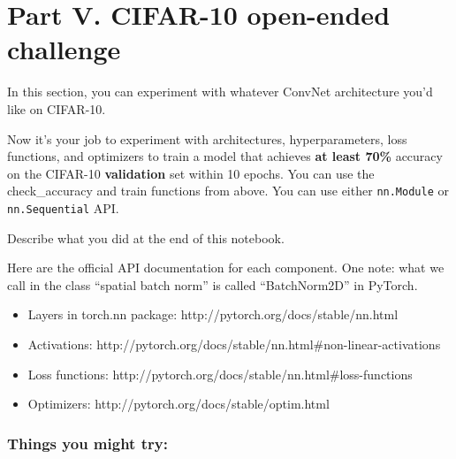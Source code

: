 \documentclass[11pt]{article}
\providecommand{\tightlist}{%
      \setlength{\itemsep}{0pt}\setlength{\parskip}{0pt}}
\begin{document}
    \hypertarget{part-v.-cifar-10-open-ended-challenge}{%
\section{Part V. CIFAR-10 open-ended
challenge}\label{part-v.-cifar-10-open-ended-challenge}}

In this section, you can experiment with whatever ConvNet architecture
you'd like on CIFAR-10.

Now it's your job to experiment with architectures, hyperparameters,
loss functions, and optimizers to train a model that achieves \textbf{at
least 70\%} accuracy on the CIFAR-10 \textbf{validation} set within 10
epochs. You can use the check\_accuracy and train functions from above.
You can use either \texttt{nn.Module} or \texttt{nn.Sequential} API.

Describe what you did at the end of this notebook.

Here are the official API documentation for each component. One note:
what we call in the class ``spatial batch norm'' is called
``BatchNorm2D'' in PyTorch.

\begin{itemize}
\tightlist
\item
  Layers in torch.nn package: http://pytorch.org/docs/stable/nn.html
\item
  Activations:
  http://pytorch.org/docs/stable/nn.html\#non-linear-activations
\item
  Loss functions: http://pytorch.org/docs/stable/nn.html\#loss-functions
\item
  Optimizers: http://pytorch.org/docs/stable/optim.html
\end{itemize}

\hypertarget{things-you-might-try}{%
\subsubsection{Things you might try:}\label{things-you-might-try}}
\end{document}

